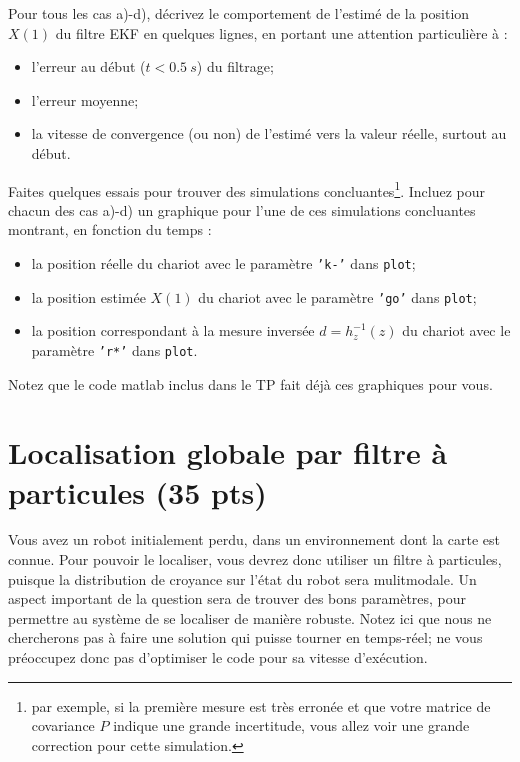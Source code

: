 \documentclass[12pt]{article}
\begin{document}
Pour tous les cas a)-d), décrivez le comportement de l'estimé de la position $X(1)$ du filtre EKF en quelques lignes, en portant une attention particulière à :
\begin{itemize}
\item l'erreur au début ($t<0.5~s$) du filtrage;
\item l'erreur moyenne;
\item la vitesse de convergence (ou non) de l'estimé vers la valeur réelle, surtout au début.
\end{itemize}
Faites quelques essais pour trouver des simulations concluantes\footnote{par exemple, si la première mesure est très erronée et que votre matrice de covariance $P$ indique une grande incertitude, vous allez voir une grande correction pour cette simulation.}. Incluez pour chacun des cas a)-d) un graphique pour l'une de ces simulations concluantes montrant, en fonction du temps :
\begin{itemize}
\item la position réelle du chariot avec le paramètre \texttt{'k-'} dans \texttt{plot};
\item la position estimée $X(1)$ du chariot avec le paramètre \texttt{'go'} dans \texttt{plot};
\item la position correspondant à la mesure inversée $d=h_z^{-1}(z)$ du chariot  avec le paramètre \texttt{'r*'} dans \texttt{plot}.
\end{itemize}
Notez que le code matlab inclus dans le TP fait déjà ces graphiques pour vous.



\newpage
\section {Localisation globale par filtre à particules (35 pts)}
\label{LocalisationGlobale}
Vous avez un robot initialement perdu, dans un environnement dont la carte est connue. Pour pouvoir le localiser, vous devrez donc utiliser un filtre à particules, puisque la distribution de croyance sur l'état du robot sera mulitmodale. Un aspect important de la question sera de trouver des bons paramètres, pour permettre au système de se localiser de manière robuste. Notez ici que nous ne chercherons pas à faire une solution qui puisse tourner en temps-réel; ne vous préoccupez donc pas d'optimiser le code pour sa vitesse d'exécution.
\end{document}
